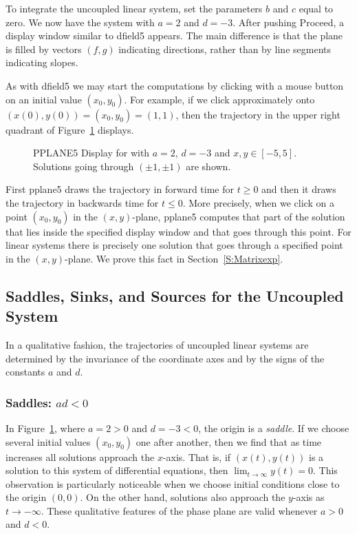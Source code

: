 To integrate the uncoupled linear system, set the parameters $b$
and $c$ equal to zero. We now have the system  with
$a = 2$ and $d = -3$.  After pushing {\sf Proceed}, a display window
similar to {\sf dfield5} appears.  The main difference is that
the plane is filled by vectors $(f,g)$ indicating directions,
rather than by line segments indicating slopes.

As with {\sf dfield5} we may start the computations by clicking
with a mouse button on an initial value $(x_0,y_0)$.  For example,
if we click approximately onto $(x(0),y(0))=(x_0,y_0)=(1,1)$, then
the trajectory in the upper right quadrant of
Figure~\ref{pp_dsp1} displays.

\begin{figure}[htb]
     \centerline{%
     }
     \caption{{\sf PPLANE5 Display} for \protect{} with
             $a=2$, $d=-3$ and $x,y\in [-5,5]$. Solutions
             going through $(\pm 1,\pm 1)$ are shown.}
     \label{pp_dsp1}
\end{figure}

First {\sf pplane5} draws the trajectory in forward time for
$t\ge 0$ and then it draws the trajectory in backwards time for
$t\le 0$.  More precisely, when we click on a point $(x_0,y_0)$ in
the $(x,y)$-plane, {\sf pplane5} computes that part of the
solution that lies inside the specified {\sf display window}
and that goes through this point.  For linear systems there is
precisely one solution that goes through a specified point in
the $(x,y)$-plane. We prove this fact in
Section~\ref{S:Matrixexp}.

\subsection*{Saddles, Sinks, and Sources for the Uncoupled System }

In a qualitative fashion, the trajectories of uncoupled linear
systems are determined by the invariance of the coordinate axes
and by the signs of the constants $a$ and $d$.

\subsubsection*{Saddles: $ad<0$} 

In Figure~\ref{pp_dsp1}, where $a=2>0$ and $d=-3<0$, the origin is a
{\em saddle\/}.  If we choose several initial values $(x_0,y_0)$
one after another,  then we find that as time increases all
solutions approach the $x$-axis.  That is, if $(x(t),y(t))$ is a 
solution to this system of differential equations, then 
$\lim_{t\to\infty}y(t)=0$.  This observation is particularly 
noticeable when we choose initial conditions close to the origin $(0,0)$.  
On the other hand, solutions also approach the $y$-axis as $t\to-\infty$.
These qualitative features of the phase plane are valid whenever 
$a>0$ and $d<0$.
 
